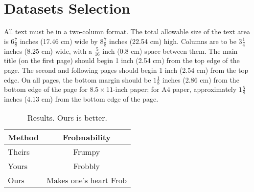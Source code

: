 \documentclass[10pt,twocolumn,letterpaper]{article}
\begin{document}
  \section{Datasets Selection}
  \label{sec:formatting}

  All text must be in a two-column format.
  The total allowable size of the text area is $6\frac78$ inches (17.46 cm) wide by $8\frac78$ inches (22.54 cm) high.
  Columns are to be $3\frac14$ inches (8.25 cm) wide, with a $\frac{5}{16}$ inch (0.8 cm) space between them.
  The main title (on the first page) should begin 1 inch (2.54 cm) from the top edge of the page.
  The second and following pages should begin 1 inch (2.54 cm) from the top edge.
  On all pages, the bottom margin should be $1\frac{1}{8}$ inches (2.86 cm) from the bottom edge of the page for $8.5 \times 11$-inch paper;
  for A4 paper, approximately $1\frac{5}{8}$ inches (4.13 cm) from the bottom edge of the
  page.

  \begin{table}
    \centering
    \begin{tabular}{@{}lc@{}}
      \toprule
      Method & Frobnability \\
      \midrule
      Theirs & Frumpy \\
      Yours & Frobbly \\
      Ours & Makes one's heart Frob\\
      \bottomrule
    \end{tabular}
    \caption{Results.   Ours is better.}
    \label{tab:example}
  \end{table}


\end{document}
